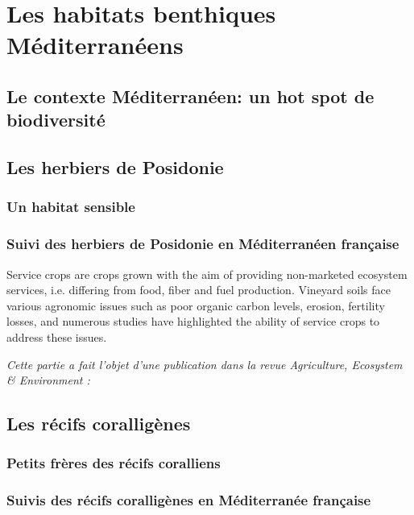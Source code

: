 
\newpage

\section[Habitats]{Les habitats benthiques Méditerranéens}
\subsection{Le contexte Méditerranéen: un hot spot de biodiversité}

\subsection[Les herbiers]{Les herbiers de Posidonie}
\subsubsection{Un habitat sensible}
\subsubsection{Suivi des herbiers de Posidonie en Méditerranéen française}

Service crops are crops grown with the aim of providing non-marketed ecosystem services, i.e. differing from food, fiber and fuel production. Vineyard soils face various agronomic issues such as poor organic carbon levels, erosion, fertility losses, and numerous studies have highlighted the ability of service crops to address these issues.

\noindent\textit{Cette partie a fait l'objet d'une publication dans la revue Agriculture, Ecosystem \& Environment :}

\subsection{Les récifs coralligènes}
\subsubsection{Petits frères des récifs coralliens}
\subsubsection{Suivis des récifs coralligènes en Méditerranée française}

